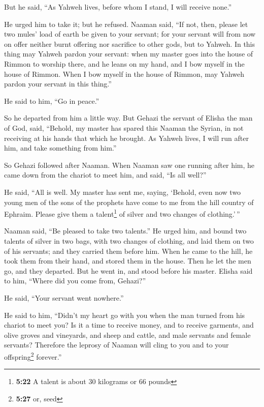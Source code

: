  But he said, ``As Yahweh lives, before whom I stand, I
will receive none.''

He urged him to take it; but he refused.  Naaman said,
``If not, then, please let two mules' load of earth be given to your
servant; for your servant will from now on offer neither burnt offering
nor sacrifice to other gods, but to Yahweh.  In this
thing may Yahweh pardon your servant: when my master goes into the house
of Rimmon to worship there, and he leans on my hand, and I bow myself in
the house of Rimmon. When I bow myself in the house of Rimmon, may
Yahweh pardon your servant in this thing.''

 He said to him, ``Go in peace.''

So he departed from him a little way.  But Gehazi the
servant of Elisha the man of God, said, ``Behold, my master has spared
this Naaman the Syrian, in not receiving at his hands that which he
brought. As Yahweh lives, I will run after him, and take something from
him.''

 So Gehazi followed after Naaman. When Naaman saw one
running after him, he came down from the chariot to meet him, and said,
``Is all well?''

 He said, ``All is well. My master has sent me, saying,
`Behold, even now two young men of the sons of the prophets have come to
me from the hill country of Ephraim. Please give them a
talent\footnote{\textbf{5:22} A talent is about 30 kilograms or 66
  pounds} of silver and two changes of clothing.'\,''

 Naaman said, ``Be pleased to take two talents.'' He
urged him, and bound two talents of silver in two bags, with two changes
of clothing, and laid them on two of his servants; and they carried them
before him.  When he came to the hill, he took them from
their hand, and stored them in the house. Then he let the men go, and
they departed.  But he went in, and stood before his
master. Elisha said to him, ``Where did you come from, Gehazi?''

He said, ``Your servant went nowhere.''

 He said to him, ``Didn't my heart go with you when the
man turned from his chariot to meet you? Is it a time to receive money,
and to receive garments, and olive groves and vineyards, and sheep and
cattle, and male servants and female servants?  Therefore
the leprosy of Naaman will cling to you and to your offspring\footnote{\textbf{5:27}
  or, seed} forever.''

